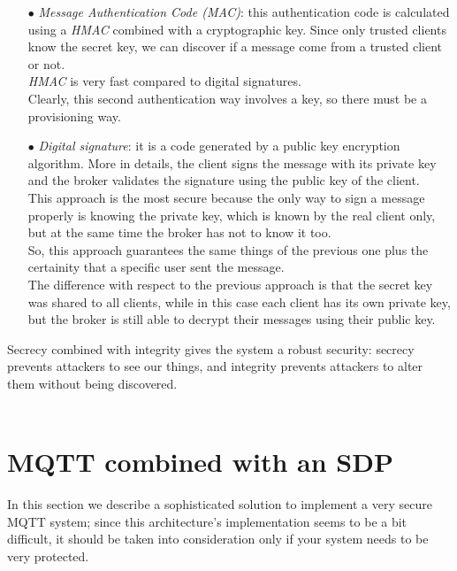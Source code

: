 \documentclass[12pt]{report}
\begin{document}
{\begin{itemize}
\item[$\bullet$] \emph{Message Authentication Code (MAC)}: this authentication code is calculated using a \emph{HMAC} combined with a cryptographic key. Since only trusted clients know the secret key, we can discover if a message come from a trusted client or not. \\
\emph{HMAC} is very fast compared to digital signatures.\\
Clearly, this second authentication way involves a key, so there must be a provisioning way.

\item[$\bullet$] \emph{Digital signature}: it is a code generated by a public key encryption algorithm. More in details, the client signs the message with its private key and the broker validates the signature using the public key of the client.\\
This approach is the most secure because the only way to sign a message properly is knowing the private key, which is known by the real client only, but at the same time the broker has not to know it too.\\
So, this approach guarantees the same things of the previous one plus the certainity that a specific user sent the message.\\
The difference with respect to the previous approach is that the secret key was shared to all clients, while in this case each client has its own private key, but the broker is still able to decrypt their messages using their public key.\\
\end{itemize}

Secrecy combined with integrity gives the system a robust security: secrecy prevents attackers to see our things, and integrity prevents attackers to alter them without being discovered.\\\\



\section{MQTT combined with an SDP}
\label{sec:mqttsdp}
\bigskip
In this section we describe a sophisticated solution to implement a very secure MQTT system; since this architecture's implementation seems to be a bit difficult, it should be taken into consideration only if your system needs to be very protected.\\

}
\end{document}
